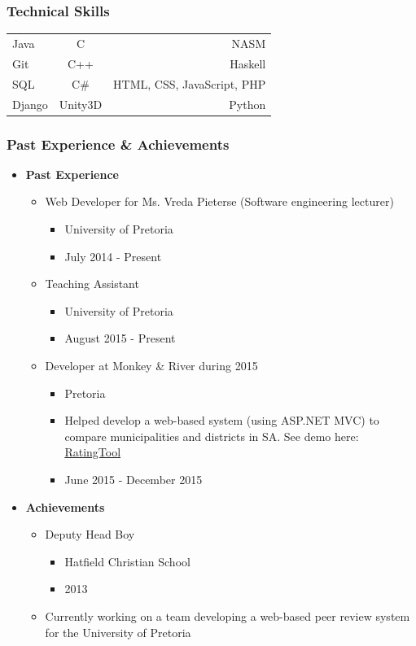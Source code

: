 \documentclass{article}
\begin{document}
\subsubsection{Technical Skills}
			\begin{tabular}{| l | c | r |}
				Java   & C		& NASM                        \\
				Git    & C++      & Haskell                     \\
				SQL    & C\#	& HTML, CSS, JavaScript, PHP   \\
				Django & Unity3D	& Python	
			\end{tabular}
		
\subsubsection{Past Experience \& Achievements}
			\begin{itemize}
				\item \textbf{Past Experience}
				\begin{itemize}
					\item Web Developer for Ms. Vreda Pieterse (Software engineering lecturer)
					\begin{itemize}
						\item University of Pretoria
						\item July 2014 - Present
					\end{itemize}
					\item Teaching Assistant
					\begin{itemize}
						\item University of Pretoria
						\item August 2015 - Present
					\end{itemize}
					\item Developer at Monkey \& River during 2015
					\begin{itemize}
						\item Pretoria
						\item Helped develop a web-based system (using ASP.NET MVC) to compare municipalities and districts in SA. See demo here: \href{http://salgabarometerdemo.org.za/RatingTool}{RatingTool}
						\item June 2015 - December 2015
					\end{itemize}
				\end{itemize}
				
				\item \textbf{Achievements}
				\begin{itemize}
					\item Deputy Head Boy
					\begin{itemize}
						\item Hatfield Christian School
						\item 2013
					\end{itemize}
					\item Currently working on a team developing a web-based peer review system for the University of Pretoria
				\end{itemize}
			\end{itemize}
\end{document}
